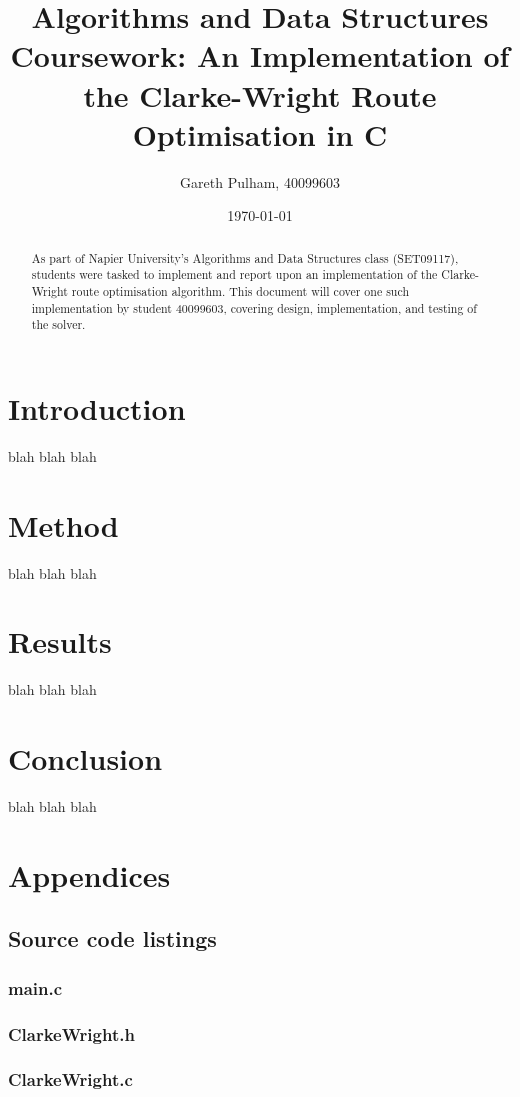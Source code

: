 \documentclass[a4paper]{article}
\begin{document}
    \begin{titlepage}
        \title{Algorithms and Data Structures Coursework: An Implementation of the Clarke-Wright Route Optimisation in C}
        \author{Gareth Pulham, 40099603}
        \date{\today}
        \maketitle
        \thispagestyle{empty}
        \begin{abstract}
            As part of Napier University's Algorithms and Data Structures class (SET09117), students were tasked to implement and report upon an implementation
            of the Clarke-Wright \cite{CW} route optimisation algorithm. This document will cover one such implementation by student 40099603, covering design,
            implementation, and testing of the solver.
        \end{abstract}
    \end{titlepage}

    \tableofcontents

    \section{Introduction}
    blah blah blah

    \section{Method}
    blah blah blah

    \section{Results}
    blah blah blah

    \section{Conclusion}
    blah blah blah

    \section{Appendices}
        \subsection{Source code listings}
            \subsubsection{main.c}
                
            \subsubsection{ClarkeWright.h}
                
            \subsubsection{ClarkeWright.c}
                
    
    
\end{document}
